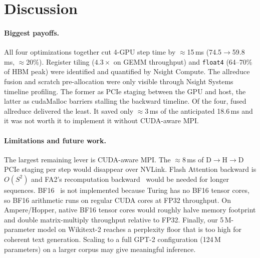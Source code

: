 \documentclass[11pt,letterpaper]{article}
\begin{document}
\section{Discussion}

\paragraph{Biggest payoffs.}
All four optimizations together cut 4-GPU step time by $\approx$15\,ms
(74.5$\to$59.8\,ms, $\approx$20\%). Register tiling ($4.3\times$ on
GEMM throughput) and \texttt{float4} (64--70\% of HBM peak) were
identified and quantified by Nsight Compute. The allreduce fusion and
scratch pre-allocation were only visible through Nsight Systems timeline
profiling. The former as PCIe staging between the GPU and host, the
latter as cudaMalloc barriers stalling the backward timeline.
Of the four, fused allreduce delivered the least. It saved only $\approx$3\,ms of the anticipated 18.6\,ms and it was not worth it to implement it without CUDA-aware MPI.

\paragraph{Limitations and future work.}
The largest remaining lever is CUDA-aware MPI. The $\approx$8\,ms of
D$\to$H$\to$D PCIe staging per step would disappear over NVLink. Flash
Attention backward is $O(S^2)$ and FA2's recomputation
backward~\cite{dao2023} would be needed for longer sequences.
BF16~\cite{micikevicius2018} is not implemented because Turing has no
BF16 tensor cores, so BF16 arithmetic runs on regular CUDA cores at FP32
throughput. On Ampere/Hopper, native BF16 tensor cores would roughly
halve memory footprint and double matrix-multiply throughput relative to
FP32. Finally, our 5\,M-parameter model on Wikitext-2 reaches a
perplexity floor that is too high for coherent text generation. Scaling
to a full GPT-2 configuration (124\,M parameters) on a larger corpus
may give meaningful inference.
\end{document}
